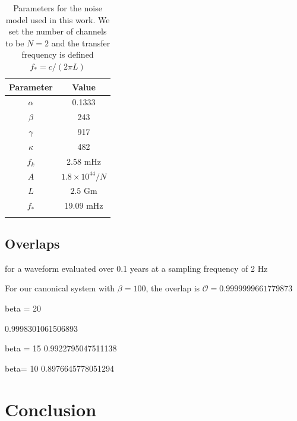 \documentclass[a4paper,fleqn,usenatbib]{mnras}
\begin{document}
\begin{table}
	\centering
	\begin{tabular}{cc}
		\noalign{\smallskip} \hline \hline \noalign{\smallskip}
		Parameter & Value \\
		\hline
		$\alpha$ & 0.1333 \\
		$\beta$ & 243 \\
		$\gamma$ & 917 \\
		$\kappa$ & 482 \\
		$f_k$ & 2.58 mHz \\
		$A$ & $1.8 \times 10^{44} / N$ \\
		$L$ & $2.5$ Gm \\
		$f_*$ & 19.09 mHz\\
		\noalign{\smallskip} \hline \noalign{\smallskip}
	\end{tabular}
	\caption{Parameters for the noise model used in this work. We set the number of channels to be $N=2$ and the transfer frequency is defined $f_* = c/(2\pi L)$}
	\label{t:parameters}
\end{table}


\subsection{Overlaps}

for a waveform evaluated over 0.1 years at a sampling frequency of 2 Hz


For our canonical system with $\beta = 100$, the overlap is $\mathcal{O} = 0.9999999661779873$

beta = 20

0.9998301061506893


beta = 15
0.9922795047511138



beta= 10
0.8976645778051294











\section{Conclusion}
\end{document}

